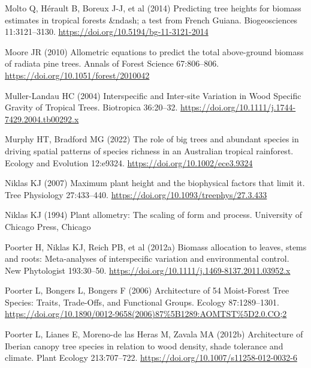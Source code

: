 \documentclass[
  12pt,
  letterpaper,
  DIV=11,
  numbers=noendperiod]{scrartcl}
\newlength{\cslhangindent}
\newlength{\cslentryspacingunit} %
\newenvironment{CSLReferences}[2] %
 {%
  \setlength{\parindent}{0pt}
  \ifodd #1
  \let\oldpar\par
  \def\par{\hangindent=\cslhangindent\oldpar}
  \fi
  \setlength{\parskip}{#2\cslentryspacingunit}
 }%
 {}
\begin{document}
\begin{CSLReferences}{1}{0}
\leavevmode{}%
Molto Q, Hérault B, Boreux J-J, et al (2014) Predicting tree heights for
biomass estimates in tropical forests \&ndash; a test from {French}
{Guiana}. Biogeosciences 11:3121--3130.
\url{https://doi.org/10.5194/bg-11-3121-2014}

\leavevmode{}%
Moore JR (2010) Allometric equations to predict the total above-ground
biomass of radiata pine trees. Annals of Forest Science 67:806--806.
\url{https://doi.org/10.1051/forest/2010042}

\leavevmode{}%
Muller-Landau HC (2004) Interspecific and {Inter}-site {Variation} in
{Wood} {Specific} {Gravity} of {Tropical} {Trees}. Biotropica 36:20--32.
\url{https://doi.org/10.1111/j.1744-7429.2004.tb00292.x}

\leavevmode{}%
Murphy HT, Bradford MG (2022) The role of big trees and abundant species
in driving spatial patterns of species richness in an {Australian}
tropical rainforest. Ecology and Evolution 12:e9324.
\url{https://doi.org/10.1002/ece3.9324}

\leavevmode{}%
Niklas KJ (2007) Maximum plant height and the biophysical factors that
limit it. Tree Physiology 27:433--440.
\url{https://doi.org/10.1093/treephys/27.3.433}

\leavevmode{}%
Niklas KJ (1994) Plant allometry: The scaling of form and process.
University of Chicago Press, Chicago

\leavevmode{}%
Poorter H, Niklas KJ, Reich PB, et al (2012a) Biomass allocation to
leaves, stems and roots: Meta-analyses of interspecific variation and
environmental control. New Phytologist 193:30--50.
\url{https://doi.org/10.1111/j.1469-8137.2011.03952.x}

\leavevmode{}%
Poorter L, Bongers L, Bongers F (2006) Architecture of 54
{Moist}-{Forest} {Tree} {Species}: {Traits}, {Trade}-{Offs}, and
{Functional} {Groups}. Ecology 87:1289--1301.
\url{https://doi.org/10.1890/0012-9658(2006)87\%5B1289:AOMTST\%5D2.0.CO;2}

\leavevmode{}%
Poorter L, Lianes E, Moreno-de las Heras M, Zavala MA (2012b)
Architecture of {Iberian} canopy tree species in relation to wood
density, shade tolerance and climate. Plant Ecology 213:707--722.
\url{https://doi.org/10.1007/s11258-012-0032-6}


\end{CSLReferences}
\end{document}

